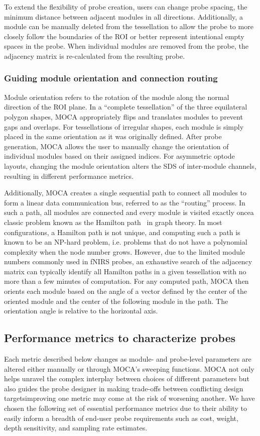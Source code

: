 To extend the flexibility of probe creation, users can change probe spacing, the minimum distance between adjacent modules in all directions. Additionally, a module can be manually deleted from the tessellation to allow the probe to more closely follow the boundaries of the \ac{ROI} or better represent intentional empty spaces in the probe. When individual modules are removed from the probe, the adjacency matrix is re-calculated from the resulting probe. 

\subsubsection{Guiding module orientation and connection routing}
Module orientation refers to the rotation of the module along the normal direction of the \ac{ROI} plane. In a ``complete tessellation'' of the three equilateral polygon shapes, \ac{MOCA} appropriately flips and translates modules to prevent gaps and overlaps. For tessellations of irregular shapes, each module is simply placed in the same orientation as it was originally defined. After probe generation, \ac{MOCA} allows the user to manually change the orientation of individual modules based on their assigned indices. For asymmetric optode layouts, changing the module orientation alters the \ac{SDS} of inter-module channels, resulting in different performance metrics.

Additionally, \ac{MOCA} creates a single sequential path to connect all modules to form a linear data communication bus, referred to as the ``routing'' process. In such a path, all modules are connected and every module is visited exactly once\textemdash a classic problem known as the Hamilton path~\cite{Kamae1967} in graph theory. In most configurations, a Hamilton path is not unique, and computing such a path is known to be an NP-hard problem, i.e. problems that do not have a polynomial complexity when the node number grows. However, due to the limited module numbers commonly used in \ac{fNIRS} probes, an exhaustive search of the adjacency matrix can typically identify all Hamilton paths in a given tessellation with no more than a few minutes of computation. For any computed path, \ac{MOCA} then orients each module based on the angle of a vector defined by the center of the oriented module and the center of the following module in the path. The orientation angle is relative to the horizontal axis.

\subsection{Performance metrics to characterize probes}
Each metric described below changes as module- and probe-level parameters are altered either manually or through \ac{MOCA}'s sweeping functions. \ac{MOCA} not only helps unravel the complex interplay between choices of different parameters but also guides the probe designer in making trade-offs between conflicting design targets\textemdash improving one metric may come at the risk of worsening another. We have chosen the following set of essential performance metrics due to their ability to easily inform a breadth of end-user probe requirements such as cost, weight, depth sensitivity, and sampling rate estimates.

